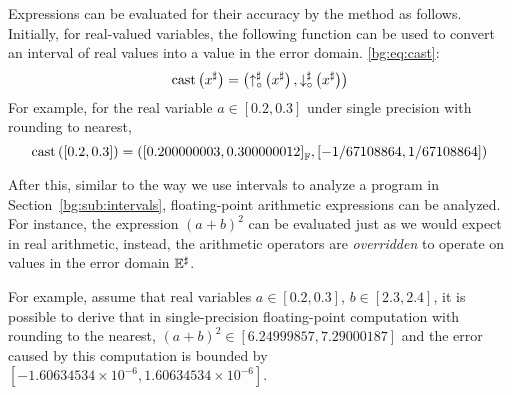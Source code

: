 Expressions can be evaluated for their accuracy by the method as follows.
Initially, for real-valued variables, the following function can be used to
convert an interval of real values into a value in the error domain.
\eqref{bg:eq:cast}:
\begin{equation}
    \mathrm{cast}\left(x^\sharp\right) = \left(
        \operatorname{\uparrow^\sharp_\circ}\left(x^\sharp\right), \operatorname{\downarrow^\sharp_\circ}\left(x^\sharp\right)
    \right)
    \label{bg:eq:cast}
\end{equation}
For example, for the real variable $a \in [0.2, 0.3]$ under single precision
with rounding to nearest,
\begin{equation}
    \mathrm{cast}\left([0.2, 0.3]\right) = \left(
        {\left[0.200000003, 0.300000012\right]}_\mathbb{F},
        \left[-1/67108864, 1/67108864\right]
    \right)
\end{equation}

After this, similar to the way we use intervals to analyze a program in
Section~\ref{bg:sub:intervals}, floating-point arithmetic expressions can be
analyzed.  For instance, the expression ${(a + b)}^2$ can be evaluated just
as we would expect in real arithmetic, instead, the arithmetic operators are
\emph{overridden} to operate on values in the error domain $\mathbb{E}^\sharp$.

For example, assume that real variables $a \in [0.2, 0.3]$, $b \in [2.3, 2.4]$,
it is possible to derive that in single-precision floating-point computation
with rounding to the nearest, ${(a + b)}^2 \in [6.24999857, 7.29000187]$ and
the error caused by this computation is bounded by $[-1.60634534\times10^{-6},
1.60634534\times10^{-6}]$.
